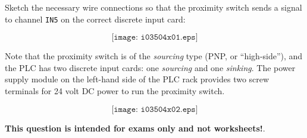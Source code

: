 

Sketch the necessary wire connections so that the proximity switch sends a signal to channel {\tt IN5} on the correct discrete input card:

$$\texttt{[image: i03504x01.eps]}$$

Note that the proximity switch is of the {\it sourcing} type (PNP, or ``high-side''), and the PLC has two discrete input cards: one {\it sourcing} and one {\it sinking}.  The power supply module on the left-hand side of the PLC rack provides two screw terminals for 24 volt DC power to run the proximity switch.







$$\texttt{[image: i03504x02.eps]}$$







{\bf This question is intended for exams only and not worksheets!}.


